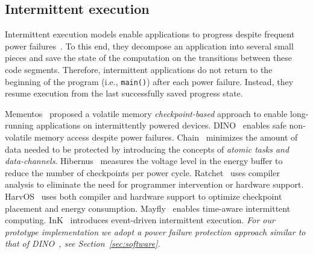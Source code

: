 \subsection{Intermittent execution}
Intermittent execution models enable applications to progress despite frequent
power failures~\cite{van2016intermittent,colin2016chain,lucia2015simpler,bhatti2017harvos,gobieski2019intelligence}. To this end, they decompose an application into several small pieces and save the state of the computation on the transitions between these code segments. Therefore, intermittent applications do not return to the beginning of the program (i.e., \texttt{main()}) after each power failure.
Instead, they resume execution from the last successfully saved progress state.   


Mementos~\cite{ransford2011mementos} proposed a volatile memory \emph{checkpoint-based} approach to enable long-running applications on intermittently powered devices. DINO~\cite{dino} enables safe non-volatile memory access despite power failures. Chain~\cite{colin2016chain} minimizes the amount of data needed to be protected by introducing the concepts of \emph{atomic tasks and data-channels}. Hibernus~\cite{balsamo2014hibernus,balsamo2016hibernus++} measures the voltage level in the energy buffer to reduce the number of checkpoints per power cycle. Ratchet~\cite{van2016intermittent} uses compiler analysis to eliminate the need for programmer intervention or hardware support. HarvOS~\cite{bhatti2017harvos} uses both compiler and hardware support to optimize checkpoint placement and energy consumption. Mayfly~\cite{hester2017timely} enables time-aware intermittent computing. InK~\cite{yildirim2018ink} introduces event-driven intermittent execution.  
\emph{For our prototype implementation we adopt a power failure protection approach similar to that of DINO~\cite{dino}, see Section~\ref{sec:software}.}


